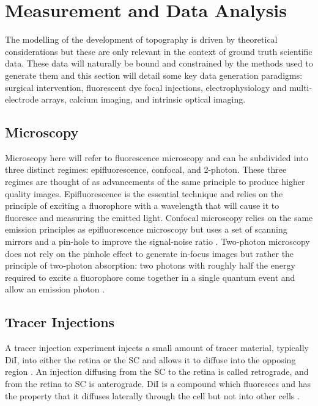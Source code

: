 \section{Measurement and Data Analysis}

The modelling of the development of topography is driven by theoretical considerations but these are only relevant in the context of ground truth scientific data. These data will naturally be bound and constrained by the methods used to generate them and this section will detail some key data generation paradigms: surgical intervention, fluorescent dye focal injections, electrophysiology and multi-electrode arrays, calcium imaging, and intrinsic optical imaging.

\subsection{Microscopy}
Microscopy here will refer to fluorescence microscopy and can be subdivided into three distinct regimes: epifluorescence, confocal, and 2-photon. These three regimes are thought of as advancements of the same principle to produce higher quality images. Epifluorescence is the essential technique and relies on the principle of exciting a fluorophore with a wavelength that will cause it to fluoresce and measuring the emitted light. Confocal microscopy relies on the same emission principles as epifluorescence microscopy but uses a set of scanning mirrors and a pin-hole to improve the signal-noise ratio \cite{Inoue2006-rk}. Two-photon microscopy does not rely on the pinhole effect to generate in-focus images but rather the principle of two-photon absorption: two photons with roughly half the energy required to excite a fluorophore come together in a single quantum event and allow an emission photon \cite{Denk1990-ub}.

\subsection{Tracer Injections}
A tracer injection experiment injects a small amount of tracer material, typically DiI, into either the retina or the SC and allows it to diffuse into the opposing region \cite{Honig1989-by}. An injection diffusing from the SC to the retina is called retrograde, and from the retina to SC is anterograde. DiI is a compound which fluoresces and has the property that it diffuses laterally through the cell but not into other cells \cite{Sherazee2013-ky}. 

